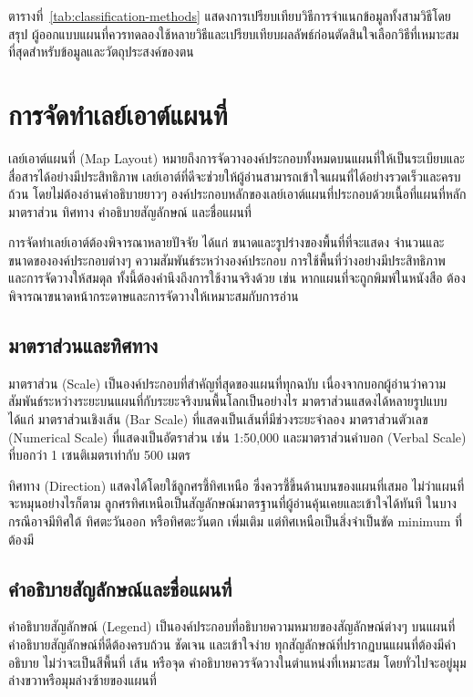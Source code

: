ตารางที่~\ref{tab:classification-methods} แสดงการเปรียบเทียบวิธีการจำแนกข้อมูลทั้งสามวิธีโดยสรุป ผู้ออกแบบแผนที่ควรทดลองใช้หลายวิธีและเปรียบเทียบผลลัพธ์ก่อนตัดสินใจเลือกวิธีที่เหมาะสมที่สุดสำหรับข้อมูลและวัตถุประสงค์ของตน

\section{การจัดทำเลย์เอาต์แผนที่}

เลย์เอาต์แผนที่ (Map Layout) หมายถึงการจัดวางองค์ประกอบทั้งหมดบนแผนที่ให้เป็นระเบียบและสื่อสารได้อย่างมีประสิทธิภาพ เลย์เอาต์ที่ดีจะช่วยให้ผู้อ่านสามารถเข้าใจแผนที่ได้อย่างรวดเร็วและครบถ้วน โดยไม่ต้องอ่านคำอธิบายยาวๆ องค์ประกอบหลักของเลย์เอาต์แผนที่ประกอบด้วยเนื้อที่แผนที่หลัก มาตราส่วน ทิศทาง คำอธิบายสัญลักษณ์ และชื่อแผนที่

การจัดทำเลย์เอาต์ต้องพิจารณาหลายปัจจัย ได้แก่ ขนาดและรูปร่างของพื้นที่ที่จะแสดง จำนวนและขนาดขององค์ประกอบต่างๆ ความสัมพันธ์ระหว่างองค์ประกอบ การใช้พื้นที่ว่างอย่างมีประสิทธิภาพ และการจัดวางให้สมดุล ทั้งนี้ต้องคำนึงถึงการใช้งานจริงด้วย เช่น หากแผนที่จะถูกพิมพ์ในหนังสือ ต้องพิจารณาขนาดหน้ากระดาษและการจัดวางให้เหมาะสมกับการอ่าน

\subsection{มาตราส่วนและทิศทาง}

มาตราส่วน (Scale) เป็นองค์ประกอบที่สำคัญที่สุดของแผนที่ทุกฉบับ เนื่องจากบอกผู้อ่านว่าความสัมพันธ์ระหว่างระยะบนแผนที่กับระยะจริงบนพื้นโลกเป็นอย่างไร มาตราส่วนแสดงได้หลายรูปแบบ ได้แก่ มาตราส่วนเชิงเส้น (Bar Scale) ที่แสดงเป็นเส้นที่มีช่วงระยะจำลอง มาตราส่วนตัวเลข (Numerical Scale) ที่แสดงเป็นอัตราส่วน เช่น 1:50,000 และมาตราส่วนคำบอก (Verbal Scale) ที่บอกว่า 1 เซนติเมตรเท่ากับ 500 เมตร

ทิศทาง (Direction) แสดงได้โดยใช้ลูกศรชี้ทิศเหนือ ซึ่งควรชี้ขึ้นด้านบนของแผนที่เสมอ ไม่ว่าแผนที่จะหมุนอย่างไรก็ตาม ลูกศรทิศเหนือเป็นสัญลักษณ์มาตรฐานที่ผู้อ่านคุ้นเคยและเข้าใจได้ทันที ในบางกรณีอาจมีทิศใต้ ทิศตะวันออก หรือทิศตะวันตก เพิ่มเติม แต่ทิศเหนือเป็นสิ่งจำเป็นขัด minimum ที่ต้องมี

\subsection{คำอธิบายสัญลักษณ์และชื่อแผนที่}

คำอธิบายสัญลักษณ์ (Legend) เป็นองค์ประกอบที่อธิบายความหมายของสัญลักษณ์ต่างๆ บนแผนที่ คำอธิบายสัญลักษณ์ที่ดีต้องครบถ้วน ชัดเจน และเข้าใจง่าย ทุกสัญลักษณ์ที่ปรากฏบนแผนที่ต้องมีคำอธิบาย ไม่ว่าจะเป็นสีพื้นที่ เส้น หรือจุด คำอธิบายควรจัดวางในตำแหน่งที่เหมาะสม โดยทั่วไปจะอยู่มุมล่างขวาหรือมุมล่างซ้ายของแผนที่

